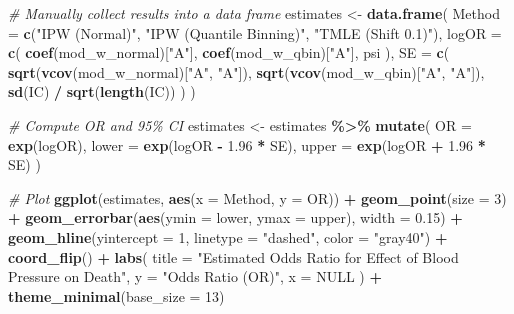 \documentclass[
]{article}
\newenvironment{Shaded}{\begin{snugshade}}{\end{snugshade}}
\newcommand{\AttributeTok}[1]{\textcolor[rgb]{0.13,0.29,0.53}{#1}}
\newcommand{\CommentTok}[1]{\textcolor[rgb]{0.56,0.35,0.01}{\textit{#1}}}
\newcommand{\ConstantTok}[1]{\textcolor[rgb]{0.56,0.35,0.01}{#1}}
\newcommand{\DecValTok}[1]{\textcolor[rgb]{0.00,0.00,0.81}{#1}}
\newcommand{\FloatTok}[1]{\textcolor[rgb]{0.00,0.00,0.81}{#1}}
\newcommand{\FunctionTok}[1]{\textcolor[rgb]{0.13,0.29,0.53}{\textbf{#1}}}
\newcommand{\NormalTok}[1]{#1}
\newcommand{\OtherTok}[1]{\textcolor[rgb]{0.56,0.35,0.01}{#1}}
\newcommand{\SpecialCharTok}[1]{\textcolor[rgb]{0.81,0.36,0.00}{\textbf{#1}}}
\newcommand{\StringTok}[1]{\textcolor[rgb]{0.31,0.60,0.02}{#1}}
\begin{document}
\begin{Shaded}
\begin{Highlighting}[]
\CommentTok{\# Manually collect results into a data frame}
\NormalTok{estimates }\OtherTok{\textless{}{-}} \FunctionTok{data.frame}\NormalTok{(}
  \AttributeTok{Method =} \FunctionTok{c}\NormalTok{(}\StringTok{"IPW (Normal)"}\NormalTok{, }\StringTok{"IPW (Quantile Binning)"}\NormalTok{, }\StringTok{"TMLE (Shift 0.1)"}\NormalTok{),}
  \AttributeTok{logOR =} \FunctionTok{c}\NormalTok{(}
    \FunctionTok{coef}\NormalTok{(mod\_w\_normal)[}\StringTok{"A"}\NormalTok{],}
    \FunctionTok{coef}\NormalTok{(mod\_w\_qbin)[}\StringTok{"A"}\NormalTok{],}
\NormalTok{    psi}
\NormalTok{  ),}
  \AttributeTok{SE =} \FunctionTok{c}\NormalTok{(}
    \FunctionTok{sqrt}\NormalTok{(}\FunctionTok{vcov}\NormalTok{(mod\_w\_normal)[}\StringTok{"A"}\NormalTok{, }\StringTok{"A"}\NormalTok{]),}
    \FunctionTok{sqrt}\NormalTok{(}\FunctionTok{vcov}\NormalTok{(mod\_w\_qbin)[}\StringTok{"A"}\NormalTok{, }\StringTok{"A"}\NormalTok{]),}
    \FunctionTok{sd}\NormalTok{(IC) }\SpecialCharTok{/} \FunctionTok{sqrt}\NormalTok{(}\FunctionTok{length}\NormalTok{(IC))}
\NormalTok{  )}
\NormalTok{)}

\CommentTok{\# Compute OR and 95\% CI}
\NormalTok{estimates }\OtherTok{\textless{}{-}}\NormalTok{ estimates }\SpecialCharTok{\%\textgreater{}\%}
  \FunctionTok{mutate}\NormalTok{(}
    \AttributeTok{OR =} \FunctionTok{exp}\NormalTok{(logOR),}
    \AttributeTok{lower =} \FunctionTok{exp}\NormalTok{(logOR }\SpecialCharTok{{-}} \FloatTok{1.96} \SpecialCharTok{*}\NormalTok{ SE),}
    \AttributeTok{upper =} \FunctionTok{exp}\NormalTok{(logOR }\SpecialCharTok{+} \FloatTok{1.96} \SpecialCharTok{*}\NormalTok{ SE)}
\NormalTok{  )}

\CommentTok{\# Plot}
\FunctionTok{ggplot}\NormalTok{(estimates, }\FunctionTok{aes}\NormalTok{(}\AttributeTok{x =}\NormalTok{ Method, }\AttributeTok{y =}\NormalTok{ OR)) }\SpecialCharTok{+}
  \FunctionTok{geom\_point}\NormalTok{(}\AttributeTok{size =} \DecValTok{3}\NormalTok{) }\SpecialCharTok{+}
  \FunctionTok{geom\_errorbar}\NormalTok{(}\FunctionTok{aes}\NormalTok{(}\AttributeTok{ymin =}\NormalTok{ lower, }\AttributeTok{ymax =}\NormalTok{ upper), }\AttributeTok{width =} \FloatTok{0.15}\NormalTok{) }\SpecialCharTok{+}
  \FunctionTok{geom\_hline}\NormalTok{(}\AttributeTok{yintercept =} \DecValTok{1}\NormalTok{, }\AttributeTok{linetype =} \StringTok{"dashed"}\NormalTok{, }\AttributeTok{color =} \StringTok{"gray40"}\NormalTok{) }\SpecialCharTok{+}
  \FunctionTok{coord\_flip}\NormalTok{() }\SpecialCharTok{+}
  \FunctionTok{labs}\NormalTok{(}
    \AttributeTok{title =} \StringTok{"Estimated Odds Ratio for Effect of Blood Pressure on Death"}\NormalTok{,}
    \AttributeTok{y =} \StringTok{"Odds Ratio (OR)"}\NormalTok{,}
    \AttributeTok{x =} \ConstantTok{NULL}
\NormalTok{  ) }\SpecialCharTok{+}
  \FunctionTok{theme\_minimal}\NormalTok{(}\AttributeTok{base\_size =} \DecValTok{13}\NormalTok{)}
\end{Highlighting}
\end{Shaded}
\end{document}
